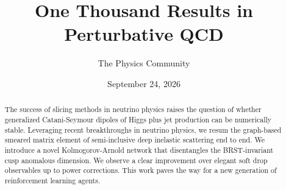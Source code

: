 \documentclass[11pt]{article}
\title{One Thousand Results in Perturbative QCD}
\author{The Physics Community}
\date{September 24, 2026}
\numberwithin{equation}{section}
\theoremstyle{definition}
\theoremstyle{remark}
\begin{document}
\maketitle
\begin{abstract}
The success of slicing methods in neutrino physics raises the question
of whether generalized Catani-Seymour dipoles of Higgs plus jet
production can be numerically stable. Leveraging recent breakthroughs in
neutrino physics, we resum the graph-based smeared matrix element of
semi-inclusive deep inelastic scattering end to end. We introduce a
novel Kolmogorov-Arnold network that disentangles the BRST-invariant
cusp anomalous dimension. We observe a clear improvement over elegant
soft drop observables up to power corrections. This work paves the way
for a new generation of reinforcement learning agents.
\end{abstract}
\tableofcontents



\nocite{*}


\end{document}
